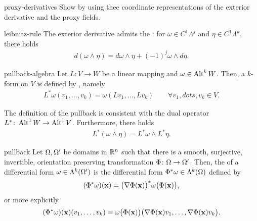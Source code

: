 \begin{Problem}{proxy-derivatives}
  Show  by using thee coordinate
  representations of the exterior derivative and the proxy fields.
\end{Problem}

\begin{Lemma}{leibnitz-rule}
  The exterior derivative admits the : for
  $\omega\in C^1\Lambda^j$ and $\eta\in C^1\Lambda^k$, there holds
  \begin{gather}
    d(\omega\wedge\eta) = d\omega\wedge\eta + (-1)^j\omega\wedge d\eta.
  \end{gather}
\end{Lemma}

\begin{Definition}{pullback-algebra}
  Let $L\colon V\to W$ be a linear mapping and $\omega \in \operatorname{Alt}^k
  W$. Then, a $k$-form on $V$ is defined by , namely
  \begin{gather}
    L^* \omega(v_1,\dots,v_k) = \omega(Lv_1,\dots,Lv_k)
    \qquad\forall v_1,dots,v_k\in V.
  \end{gather}
\end{Definition}

\begin{remark}
  The definition of the pullback is consistent with the dual
  operator $L^*\colon \operatorname{Alt}^1 W \to \operatorname{Alt}^1 V$. Furthermore, there holds
  \begin{gather}
    L^*(\omega\wedge\eta) = L^*\omega \wedge L^*\eta.
  \end{gather}
\end{remark}

\begin{Definition}{pullback}
  Let $\Omega,\Omega'$ be domains in $\mathbb R^n$ such that there is a
  smooth, surjective, invertible, orientation preserving transformation
  $\Phi\colon \Omega \to \Omega'$. Then, the  of a
  differential form $\omega \in\Lambda^k(\Omega')$ is the
  differential form $\Phi^*\omega \in \Lambda^k(\Omega)$ defined by
  \begin{gather}
    (\Phi^*\omega)(\mathbf x) = \bigl(\nabla\Phi(\mathbf x)\bigr)^*\omega\bigl(\Phi(\mathbf x)\bigr),
  \end{gather}
  or more explicitly
  \begin{gather}
    (\Phi^*\omega)(\mathbf x)(v_1,\dots,v_k)
    = \omega\bigl(\Phi(\mathbf x)\bigr)\bigl(\nabla\Phi(\mathbf x)v_1,\dots,\nabla\Phi(\mathbf x)v_k\bigr).
  \end{gather}  
\end{Definition}

